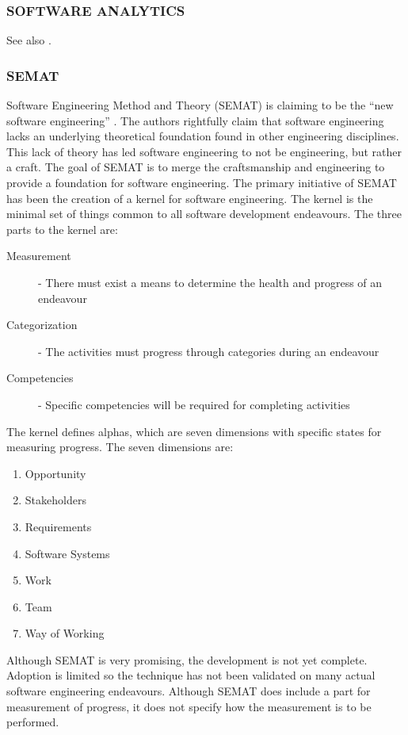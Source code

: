 \documentclass[SDSUThesis.tex]{subfiles}
\begin{document}
\subsubsection{SOFTWARE ANALYTICS}
See also \cite{Buse2010}.

\subsubsection{SEMAT}

    Software Engineering Method and Theory (SEMAT) is claiming to be the ``new software engineering'' 
    \cite{Jacobson2014}.  The authors rightfully claim that software engineering lacks
    an underlying theoretical foundation found in other engineering disciplines.  This lack of theory
    has led software engineering to not be engineering, but rather a craft.  The goal of 
    SEMAT is to merge the craftsmanship and engineering to provide a foundation for software
    engineering.  The primary initiative of SEMAT has been the creation of a kernel for 
    software engineering.  The kernel is the minimal set of things common to all software development
    endeavours. The three parts to the kernel are:
    \begin{description}
        \item[Measurement] - There must exist a means to determine the health and progress of an endeavour
        \item[Categorization]-  The activities must progress through categories during an endeavour
        \item[Competencies] - Specific competencies will be required for completing activities
    \end{description}
    The kernel defines alphas, which are seven dimensions with
    specific states for measuring progress. 
    The seven dimensions are: 
    \begin{enumerate}
        \item Opportunity
        \item Stakeholders
        \item Requirements
        \item Software Systems
        \item Work
        \item Team
        \item Way of Working
    \end{enumerate}
    
    Although SEMAT is very promising, the development is not yet complete.  Adoption is
    limited so the technique has not been validated on many
    actual software engineering endeavours.  Although SEMAT does include a part for
    measurement of progress, it does not specify how the measurement is to be 
    performed.
\end{document}
